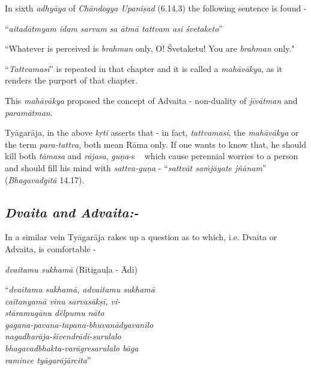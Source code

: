 In sixth \textit{adhyāya} of \textit{Chāndogya Upaniṣad} (6.14.3) the following sentence is found -

\begin{myquote}
“\textit{aitadātmyam idam sarvam sa ātmā tattvam asi śvetaketo}”
\end{myquote}

``Whatever is perceived is \textit{brahman} only, O! Śvetaketu! You are \textit{brahman} only."

“\textit{Tattvamasi}” is repeated in that chapter and it is called a \textit{mahāvākya}, as it renders the purport of that chapter.

This \textit{mahāvākya} proposed the concept of Advaita - non-duality of \textit{jīvātman} and \textit{paramātman}.

Tyāgarāja, in the above \textit{kṛti} asserts that - in fact, \textit{tattvamasi}, the \textit{mahāvākya} or the term \textit{para-tattva}, both mean Rāma only. If one wants to know that, he should kill both \textit{tāmasa} and \textit{rājasa}, \textit{guṇa}-s   which cause perennial worries to a person and should fill his mind with \textit{sattva-guṇa} - “\textit{sattvāt saṁjāyate jñānam}” (\textit{Bhagavadgītā} 14.17).


\subsection*{\textit{Dvaita and Advaita:-}}

In a similar vein Tyāgarāja rakes up a question as to which, i.e. Dvaita or Advaita, is comfortable - 

\textit{dvaitamu sukhamā} (Rītigauḷa - Ādi)

\begin{centerquote}
“\textit{dvaitamu sukhamā, advaitamu sukhamā}\\ \textit{caitanyamā vinu sarvasākṣī, vi-}\\ \textit{stāramugānu dêlpumu nāto}\\ \textit{gagana-pavana-tapana-bhuvanādyavanilo}\\ \textit{nagadharāja-śivendrādi-surulalo}\\ \textit{bhagavadbhakta-varāgresarulalo bāga}\\ \textit{ramince tyāgarājārcita}”
\end{centerquote}

